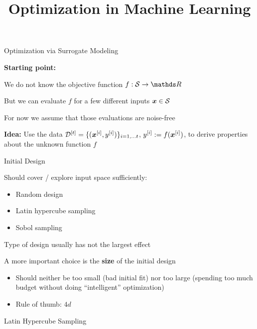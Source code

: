 \documentclass[11pt,compress,t,notes=noshow, xcolor=table]{beamer}
\title{Optimization in Machine Learning}
\begin{document}

\begin{framei}{Optimization via Surrogate Modeling}
\item[] \textbf{Starting point:}
\item We do not know the objective function $f: \S \to \R$
\item But we can evaluate $f$ for a few different inputs $\bm{x} \in \mathcal{S}$
\item For now we assume that those evaluations are noise-free
\item \textbf{Idea:}
Use the data $\mathcal{D}^{[t]} = \{(\bm{x}^{[i]}, y^{[i]})\}_{i = 1, \ldots t}$, $y^{[i]} := f(\bm{x}^{[i]})$, to derive properties about the unknown function $f$
\vfill
{}
\end{framei}


\begin{framei}{Initial Design}
\item Should cover / explore input space sufficiently:
\begin{itemize}
\item Random design
\item Latin hypercube sampling
\item Sobol sampling
\end{itemize}
\item Type of design usually has not the largest effect
\item A more important choice is the \textbf{size} of the initial design
\begin{itemize}
\item Should neither be too small (bad initial fit) nor too large (spending too much budget without doing \enquote{intelligent} optimization)
\item Rule of thumb: $4d$
\end{itemize}
\end{framei}


\begin{framev}{Latin Hypercube Sampling}
\end{framev}
\end{document}

